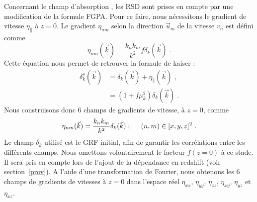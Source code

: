 \documentclass[11pt, twoside, a4paper, openright]{report}
\begin{document}
Concernant le champ d'absorption \lya{}, les RSD sont prises en compte par une modification de la formule FGPA. Pour ce faire, nous nécessitons le gradient de vitesse $\eta_{\parallel}$ à $z=0$. Le gradient $\eta_{nm}$ selon la direction $\vec u_m$ de la vitesse $v_n$ est défini comme
\begin{equation}
  \label{eq:eta1}
  \eta_{nm}(\vec k) = \frac{k_n k_m}{k^2} f \delta_k(\vec k) \; .
\end{equation}
Cette équation nous permet de retrouver la formule de kaiser :
\begin{align}
  \delta_k^s(\vec k) &= \delta_k(\vec k) + \eta_{\parallel}(\vec k) \; ,\\
                     &= (1 + f \mu_k^2) \delta_k(\vec k)  \; .  
\end{align}
Nous construisons donc 6 champs de gradients de vitesse, à $z=0$, comme
\begin{equation}
  \label{eq:eta2}
  \eta_{nm}(\vec k) = \frac{k_n k_m}{k^2} \delta_k(\vec k) \; ; \hspace{0.5cm} (n,m) \in [x, y, z]^2 \; .
\end{equation}
Le champ $\delta_k$ utilisé est le GRF initial, afin de garantir les corrélations entre les différents champs. Nous omettons volontairement le facteur $f(z=0)$ à ce stade. Il sera pris en compte lors de l'ajout de la dépendance en redshift (voir section~\ref{prov}). A l'aide d'une transformation de Fourier, nous obtenons les 6 champs de gradients de vitesses  à $z = 0$ dans l'espace réel $\eta_{xx}$, $\eta_{yy}$, $\eta_{zz}$, $\eta_{xy}$, $\eta_{yz}$ et $\eta_{xz}$.




\end{document}
